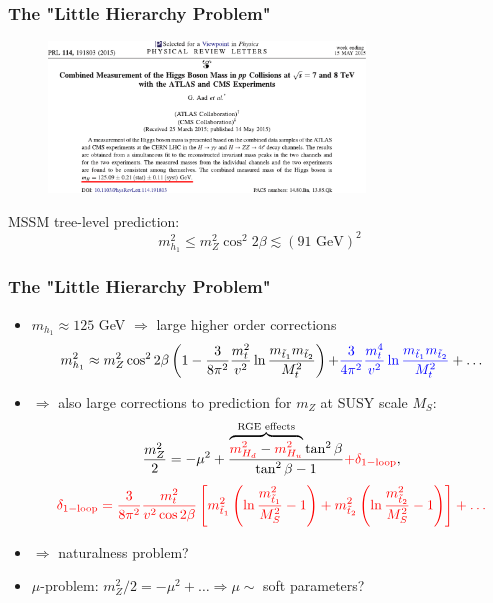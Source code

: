 \documentclass[10pt,aspectratio=169]{beamer}
\begin{document}
\begin{frame}
  \frametitle{The "Little Hierarchy Problem"}
   \begin{figure}
      \includegraphics[width=0.75\textwidth]{higgs_mass_prl}
    \end{figure}
    \begin{center}
      MSSM tree-level prediction:
    \begin{equation*}
      m_{h_1}^2 \leq m_Z^2 \cos^2 2\beta \lesssim (91 \text{ GeV})^2
   \end{equation*}
 \end{center}
\end{frame}

\begin{frame}
  \frametitle{The "Little Hierarchy Problem"}
  \begin{itemize}\itemsep1em
    \item $m_{h_1} \approx 125$ GeV $\Rightarrow$ large higher order
      corrections
      \begin{equation*}
        m_{h_1}^2 \approx m_Z^2 \cos^2 2\beta \left ( 1 - \frac{3}{8\pi^2}
          \frac{m_t^2}{v^2} \ln \frac{m_{\tilde{t}_1} m_{\tilde{t}_2}}{M_t^2}
          \right ) {+ \color{blue} \frac{3}{4\pi^2} \frac{m_t^4}{v^2} \ln
          \frac{m_{\tilde{t}_1} m_{\tilde{t}_2}}{M_t^2}} + \ldots
      \end{equation*}
    \item $\Rightarrow$ also large corrections to prediction for $m_Z$
      at SUSY scale $M_S$:
      \begin{equation*}
        \frac{m_Z^2}{2} = -\mu^2 + \frac{\overbrace{{\color{red} m_{H_d}^2} -
          {\color{red} m_{H_u}^2}}^{\text{RGE effects}} \tan^2\beta}
          {\tan^2\beta - 1} {\color{red} +  \delta_{1-\textrm{loop}}} ,
      \end{equation*}
      \begin{equation*}
          {\color{red}
          \delta_{1-\textrm{loop}} = \frac{3}{8\pi^2} \frac{m_t^2}{v^2
            \cos 2\beta} \left [ m_{\tilde{t}_1}^2 \left ( \ln
            \frac{m_{\tilde{t}_1}^2}{M_S^2} - 1 \right ) + m_{\tilde{t}_2}^2
            \left ( \ln \frac{m_{\tilde{t}_2}^2}{M_S^2} - 1 \right ) \right ]
            + \ldots }
      \end{equation*}
    \item $\Rightarrow$ naturalness problem?
    \item \alert{$\mu$-problem}: $m_Z^2/2 = -\mu^2 + \ldots \Rightarrow \mu
      \sim$ soft parameters?
  \end{itemize}
\end{frame}
\end{document}
